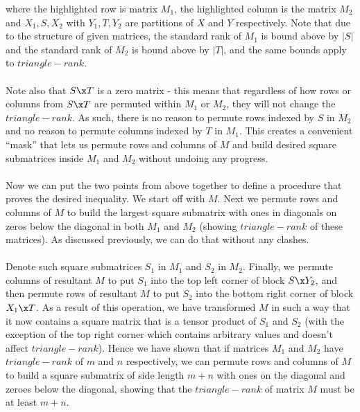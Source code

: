 \documentclass{article}
\begin{document}
\begin{enumerate}
\begin{enumerate}
            where the highlighted row is matrix $M_1$, the highlighted column
            is the matrix $M_2$ and $X_1, S, X_2$ with $Y_1, T, Y_2$ are
            partitions of $X$ and $Y$ respectively. Note that due to the
            structure of given matrices, the standard rank of $M_1$ is bound
            above by $|S|$ and the standard rank of $M_2$ is bound above by
            $|T|$, and the same bounds apply to $triangle-rank$.
            \\\\
            Note also that $S \x T$ is a zero matrix - this means that
            regardless of how rows or columns from $S \x T$ are permuted within
            $M_1$ or $M_2$, they will not change the $triangle-rank$. As such,
            there is no reason to permute rows indexed by $S$ in $M_2$ and no
            reason to permute columns indexed by $T$ in $M_1$. This creates a
            convenient ``mask'' that lets us permute rows and columns of $M$
            and build desired square submatrices inside $M_1$ and $M_2$ without 
            undoing any progress.
            \\\\
            Now we can put the two points from above together to define a
            procedure that proves the desired inequality. We start off with
            $M$. Next we permute rows and columns of $M$ to build the largest
            square submatrix with ones in diagonals on zeros below the diagonal
            in both $M_1$ and $M_2$ (showing $triangle-rank$ of these
            matrices). As discussed previously, we can do that without any
            clashes.
            \\\\
            Denote such square submatrices $S_1$ in $M_1$ and $S_2$ in $M_2$.
            Finally, we permute columns of resultant $M$ to put $S_1$ into the
            top left corner of block $S \x Y_2$, and then permute rows of
            resultant $M$ to put $S_2$ into the bottom right corner of block
            $X_1 \x T$. As a result of this operation, we have transformed $M$
            in such a way that it now contains a square matrix that is a tensor
            product of $S_1$ and $S_2$ (with the exception of the top right
            corner which contains arbitrary values and doesn't affect
            $triangle-rank$). Hence we have shown that if matrices $M_1$ and
            $M_2$ have $triangle-rank$ of $m$ and $n$ respectively, we can
            permute rows and columns of $M$ to build a square submatrix of side
            length $m + n$ with ones on the diagonal and zeroes below the
            diagonal, showing that the $triangle-rank$ of matrix $M$ must be at
            least $m + n$.


\end{enumerate}
\end{enumerate}
\end{document}
